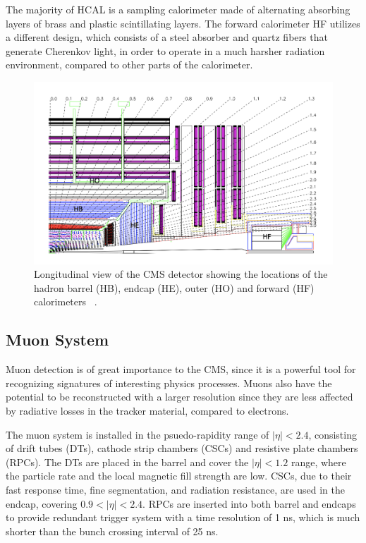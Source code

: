 The majority of HCAL is a sampling calorimeter made of alternating absorbing layers of brass and plastic scintillating layers. 
The forward calorimeter HF utilizes a different design, which consists of a steel absorber and quartz fibers that generate Cherenkov light, 
in order to operate in a much harsher radiation environment, compared to other parts of the calorimeter.

\begin{figure}
    \begin{minipage}[t]{\linewidth}\centering
        \includegraphics[width=15cm]{hcal_layout.png}
    \end{minipage}
    \caption{Longitudinal view of the CMS detector showing the locations of the hadron barrel (HB), endcap (HE), outer (HO) 
    and forward (HF) calorimeters ~\cite{cms:cms_experiment}.}
    \label{fig:hcal_layout}
\end{figure}

\subsection{Muon System}

Muon detection is of great importance to the CMS, since it is a powerful tool for recognizing signatures of interesting physics processes. Muons also have the
potential to be reconstructed with a larger resolution since they are less affected by radiative losses in the tracker material, compared to electrons. 

The muon system is installed in the psuedo-rapidity range of $|\eta| < 2.4$, consisting of drift tubes (DTs), cathode strip chambers (CSCs) and 
resistive plate chambers (RPCs). The DTs are placed in the barrel and cover the $|\eta| < 1.2$ range, where the particle rate and the local 
magnetic fill strength are low. CSCs, due to their fast response time, fine segmentation, and radiation resistance, are used in the endcap, covering
$0.9 < |\eta| < 2.4$. RPCs are inserted into both barrel and endcaps to provide redundant trigger system with a time resolution of 1 ns, 
which is much shorter than the bunch crossing interval of 25 ns.

